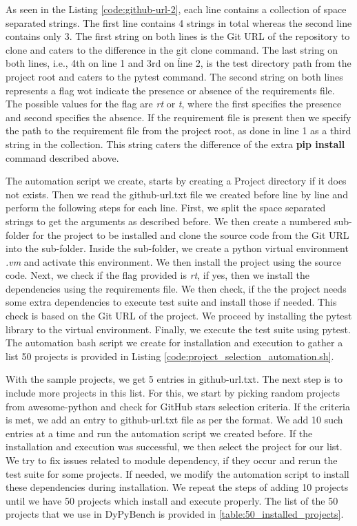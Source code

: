 As seen in the Listing \ref{code:github-url-2}, each line contains a collection of space separated strings.
The first line contains 4 strings in total whereas the second line contains only 3.
The first string on both lines is the Git URL of the repository to clone and caters to the difference in the git clone command.
The last string on both lines, i.e., 4th on line 1 and 3rd on ĺine 2, is the test directory path from the project root and caters to the pytest command.
The second string on both lines represents a flag wot indicate the presence or absence of the requirements file.
The possible values for the flag are \textit{rt} or \textit{t}, where the first specifies the presence and second specifies the absence.
If the requirement file is present then we specify the path to the requirement file from the project root, as done in line 1 as a third string in the collection. 
This string caters the difference of the extra \textbf{pip install} command described above. 

The automation script we create, starts by creating a Project directory if it does not exists.
Then we read the github-url.txt file we created before line by line and perform the following steps for each line.
First, we split the space separated strings to get the arguments as described before.
We then create a numbered sub-folder for the project to be installed and clone the source code from the Git URL into the sub-folder.
Inside the sub-folder, we create a python virtual environment \textit{.vm} and activate this environment.
We then install the project using the source code.
Next, we check if the flag provided is \textit{rt}, if yes, then we install the dependencies using the requirements file.
We then check, if the the project needs some extra dependencies to execute test suite and install those if needed.
This check is based on the Git URL of the project.
We proceed by installing the pytest library to the virtual environment.
Finally, we execute the test suite using pytest.
The automation bash script we create for installation and execution to gather a list 50 projects is provided in Listing \ref{code:project_selection_automation.sh}.

With the sample projects, we get 5 entries in github-url.txt.
The next step is to include more projects in this list.
For this, we start by picking random projects from awesome-python and check for GitHub stars selection criteria.
If the criteria is met, we add an entry to github-url.txt file as per the format.
We add 10 such entries at a time and run the automation script we created before.
If the installation and execution was successful, we then select the project for our list.
We try to fix issues related to module dependency, if they occur and rerun the test suite for some projects.
If needed, we modify the automation script to install these dependencies during installation. 
We repeat the steps of adding 10 projects until we have 50 projects which install and execute properly.
The list of the 50 projects that we use in DyPyBench is provided in \ref{table:50_installed_projects}.

